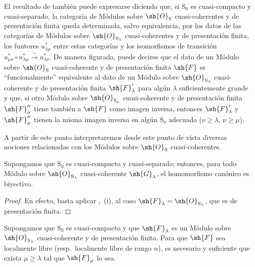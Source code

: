 \begin{env}[8.5.3]
\label{IV.8.5.3}
El resultado de  también puede expresarse diciendo que, si $\mathrm{S}_0$ es cuasi-compacto y cuasi-separado, la categoría de Módulos sobre $\sh{O}_\mathrm{S}$ cuasi-coherentes y de presentación finita queda determinada, salvo equivalencia, por los datos de las categorías de Módulos sobre $\sh{O}_{\mathrm{S}_\lambda}$ cuasi-coherentes y de presentación finita, los funtores $u_{\lambda\mu}^*$ entre estas categorías y los isomorfismos de transición $u_{\mu\nu}^*\circ u_{\lambda\mu}^*\xrightarrow{\sim}u_{\lambda\nu}^*$.
De manera figurada, puede decirse que el dato de un Módulo sobre $\sh{O}_\mathrm{S}$ cuasi-coherente y de presentación finita $\sh{F}$ es ``funcionalmente'' equivalente al dato de un Módulo sobre $\sh{O}_{\mathrm{S}_\lambda}$ cuasi-coherente y de presentación finita $\sh{F}'_\lambda$ para algún $\lambda$ suficientemente grande y que, si otro Módulo sobre $\sh{O}_{\mathrm{S}_\mu}$ cuasi-coherente y de presentación finita $\sh{F}''_\mu$ tiene también a $\sh{F}$ como imagen inversa, entonces $\sh{F}'_\lambda$ y $\sh{F}''_\mu$ tienen la misma imagen inversa en algún $\mathrm{S}_\nu$ adecuado ($\nu\geqslant\lambda$, $\nu\geqslant\mu$).

A partir de este punto interpretaremos desde este punto de vista diversas nociones relacionadas con los Módulos sobre $\sh{O}_\mathrm{S}$ cuasi-coherentes.
\end{env}

\begin{corollary}[8.5.4]
\label{IV.8.5.4}
Supongamos que $\mathrm{S}_0$ es cuasi-compacto y cuasi-separado; entonces, para todo Módulo sobre $\sh{O}_{\mathrm{S}_\lambda}$ cuasi-coherente $\sh{G}_\lambda$, el homomorfismo canónico  es biyectivo.
\end{corollary}

\begin{proof}
En efecto, basta aplicar ,~(i), al caso $\sh{F}_\lambda=\sh{O}_{\mathrm{S}_\lambda}$, que es de presentación finita.
\end{proof}

\begin{proposition}[8.5.5]
\label{IV.8.5.5}
Supongamos que $\mathrm{S}_0$ es cuasi-compacto y que $\sh{F}_\lambda$ es un Módulo sobre $\sh{O}_{\mathrm{S}_\lambda}$ cuasi-coherente y de presentación finita.
Para que $\sh{F}$ sea localmente libre (resp.\ localmente libre de rango $n$), es necesario y suficiente que exista $\mu\geqslant\lambda$ tal que $\sh{F}_\mu$ lo sea.
\end{proposition}


